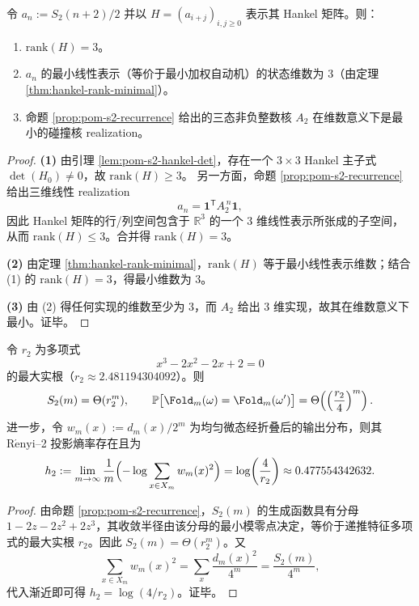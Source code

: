 \begin{theorem}\label{thm:pom-s2-rank-exact}
令 \(a_n:=S_2(n+2)/2\) 并以 \(H=(a_{i+j})_{i,j\ge 0}\) 表示其 Hankel 矩阵。则：
\begin{enumerate}
  \item \(\mathrm{rank}(H)=3\)。
  \item \(a_n\) 的最小线性表示（等价于最小加权自动机）的状态维数为 \(3\)（由定理 \ref{thm:hankel-rank-minimal}）。
  \item 命题 \ref{prop:pom-s2-recurrence} 给出的三态非负整数核 \(A_2\) 在维数意义下是最小的碰撞核 realization。
\end{enumerate}
\end{theorem}
\begin{proof}
\textbf{(1)} 由引理 \ref{lem:pom-s2-hankel-det}，存在一个 \(3\times 3\) Hankel 主子式 \(\det(H_0)\neq 0\)，故 \(\mathrm{rank}(H)\ge 3\)。
另一方面，命题 \ref{prop:pom-s2-recurrence} 给出三维线性 realization
$$
a_n=\mathbf{1}^{\mathsf T}A_2^{\,n}\mathbf{1},
$$
因此 Hankel 矩阵的行/列空间包含于 \(\mathbb{R}^3\) 的一个 3 维线性表示所张成的子空间，从而 \(\mathrm{rank}(H)\le 3\)。合并得 \(\mathrm{rank}(H)=3\)。

\textbf{(2)} 由定理 \ref{thm:hankel-rank-minimal}，\(\mathrm{rank}(H)\) 等于最小线性表示维数；结合 (1) 的 \(\mathrm{rank}(H)=3\)，得最小维数为 \(3\)。

\textbf{(3)} 由 (2) 得任何实现的维数至少为 3，而 \(A_2\) 给出 3 维实现，故其在维数意义下最小。证毕。
\end{proof}

\begin{corollary}\label{cor:pom-s2-asymptotic}
令 \(r_2\) 为多项式
$$
x^3-2x^2-2x+2=0
$$
的最大实根（\(r_2\approx 2.481194304092\)）。则
$$
S_2(m)=\Theta(r_2^m),
\qquad
\mathbb{P}\bigl[\Fold_m(\omega)=\Fold_m(\omega')\bigr]
=\Theta\!\left(\left(\frac{r_2}{4}\right)^m\right).
$$
进一步，令 \(w_m(x):=d_m(x)/2^m\) 为均匀微态经折叠后的输出分布，则其 \(\mathrm{R\acute{e}nyi}\)--2 投影熵率存在且为
$$
h_2:=\lim_{m\to\infty}\frac{1}{m}\Bigl(-\log\sum_{x\in X_m}w_m(x)^2\Bigr)
=\log\!\left(\frac{4}{r_2}\right)\approx 0.477554342632.
$$
\end{corollary}
\begin{proof}
由命题 \ref{prop:pom-s2-recurrence}，\(S_2(m)\) 的生成函数具有分母 \(1-2z-2z^2+2z^3\)，其收敛半径由该分母的最小模零点决定，等价于递推特征多项式的最大实根 \(r_2\)。因此 \(S_2(m)=\Theta(r_2^m)\)。又
$$
\sum_{x\in X_m}w_m(x)^2=\sum_x \frac{d_m(x)^2}{4^m}=\frac{S_2(m)}{4^m},
$$
代入渐近即可得 \(h_2=\log(4/r_2)\)。证毕。
\end{proof}

